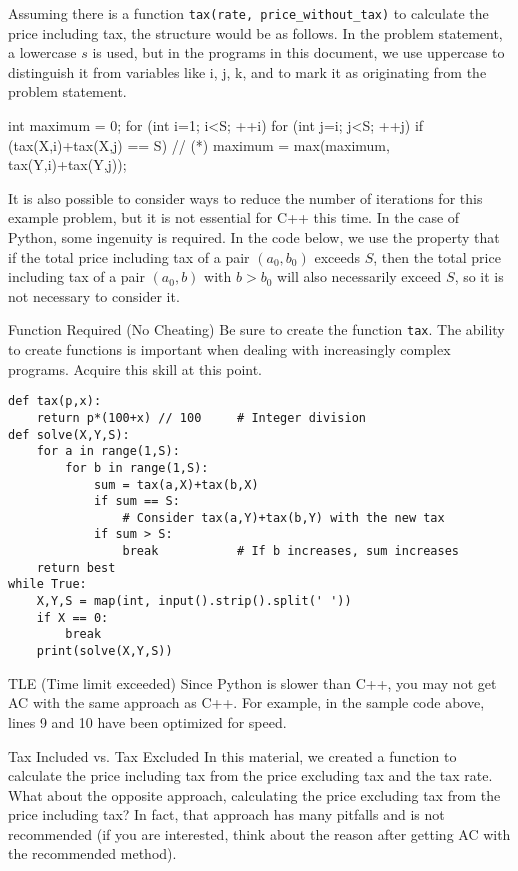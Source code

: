 Assuming there is a function \texttt{tax(rate, price\_without\_tax)} to calculate the price including tax, the structure would be as follows. In the problem statement, a lowercase $s$ is used, but in the programs in this document, we use uppercase to distinguish it from variables like i, j, k, and to mark it as originating from the problem statement.
\begin{cbox}
  int maximum = 0;
  for (int i=1; i<S; ++i)
    for (int j=i; j<S; ++j) 
      if (tax(X,i)+tax(X,j) == S) // (*)
        maximum = max(maximum, tax(Y,i)+tax(Y,j));
\end{cbox}
It is also possible to consider ways to reduce the number of iterations for this example problem, but it is not essential for C++ this time.
In the case of Python, some ingenuity is required. In the code below, we use the property that if the total price including tax of a pair $(a_0, b_0)$ exceeds $S$, then the total price including tax of a pair $(a_0, b)$ with $b > b_0$ will also necessarily exceed $S$, so it is not necessary to consider it.

\begin{warningbox}{Function Required (No Cheating)}
  Be sure to create the function \texttt{tax}. The ability to create functions is important when dealing with increasingly complex programs. Acquire this skill at this point.
\end{warningbox}

\begin{pybox}[emph={break}]
\begin{verbatim}
def tax(p,x):
    return p*(100+x) // 100     # Integer division
def solve(X,Y,S):
    for a in range(1,S):
        for b in range(1,S):
            sum = tax(a,X)+tax(b,X)
            if sum == S:
                # Consider tax(a,Y)+tax(b,Y) with the new tax
            if sum > S:
                break           # If b increases, sum increases
    return best
while True:
    X,Y,S = map(int, input().strip().split(' '))
    if X == 0:
        break
    print(solve(X,Y,S))
\end{verbatim}
\end{pybox}

\begin{debugbox}{TLE (Time limit exceeded)}
  Since Python is slower than C++, you may not get AC with the same approach as C++. For example, in the sample code above, lines 9 and 10 have been optimized for speed.
\end{debugbox}

\begin{warningbox}{Tax Included vs. Tax Excluded}
  In this material, we created a function to calculate the price including tax from the price excluding tax and the tax rate. What about the opposite approach, calculating the price excluding tax from the price including tax? In fact, that approach has many pitfalls and is not recommended (if you are interested, think about the reason after getting AC with the recommended method).
\end{warningbox}

